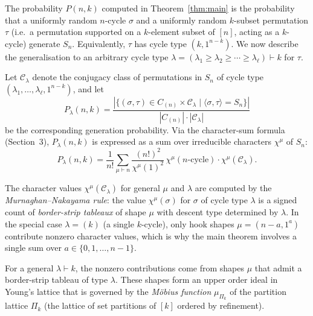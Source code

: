 The probability $P(n,k)$ computed in Theorem~\ref{thm:main} is the
probability that a uniformly random $n$-cycle $\sigma$ and a uniformly random
$k$-subset permutation $\tau$ (i.e.\ a permutation supported on a
$k$-element subset of $[n]$, acting as a $k$-cycle) generate $S_n$.
Equivalently, $\tau$ has cycle type $(k,1^{n-k})$.  We now describe the
generalisation to an arbitrary cycle type $\lambda=(\lambda_1\ge\lambda_2\ge
\cdots\ge\lambda_\ell)\vdash k$ for $\tau$.

Let $\mathcal{C}_\lambda$ denote the conjugacy class of permutations in $S_n$
of cycle type $(\lambda_1,\ldots,\lambda_\ell,1^{n-k})$, and let
\[
  P_\lambda(n,k)
  = \frac{|\{(\sigma,\tau)\in C_{(n)}\times\mathcal{C}_\lambda
           \mid \langle\sigma,\tau\rangle = S_n\}|}
         {|C_{(n)}|\cdot|\mathcal{C}_\lambda|}
\]
be the corresponding generation probability.  Via the character-sum formula
(Section~3), $P_\lambda(n,k)$ is expressed as a sum over irreducible characters
$\chi^\mu$ of $S_n$:
\begin{equation}\label{eq:char_sum_lambda}
  P_\lambda(n,k)
  = \frac{1}{n!}\sum_{\mu\vdash n}
    \frac{(n!)^2}{\chi^\mu(1)^2}\,
    \chi^\mu(n\text{-cycle})\cdot\chi^\mu(\mathcal{C}_\lambda).
\end{equation}

The character values $\chi^\mu(\mathcal{C}_\lambda)$ for general $\mu$ and
$\lambda$ are computed by the \emph{Murnaghan–Nakayama rule}: the value
$\chi^\mu(\sigma)$ for $\sigma$ of cycle type $\lambda$ is a signed count of
\emph{border-strip tableaux} of shape $\mu$ with descent type determined by
$\lambda$.  In the special case $\lambda=(k)$ (a single $k$-cycle), only hook
shapes $\mu=(n-a,1^a)$ contribute nonzero character values, which is why the
main theorem involves a single sum over $a\in\{0,1,\ldots,n-1\}$.

For a general $\lambda\vdash k$, the nonzero contributions come from shapes
$\mu$ that admit a border-strip tableau of type $\lambda$.  These shapes form
an upper order ideal in Young's lattice that is governed by the
\emph{Möbius function} $\mu_{\Pi_k}$ of the partition lattice $\Pi_k$ (the
lattice of set partitions of $[k]$ ordered by refinement).

